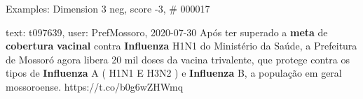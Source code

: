 \begin{frame}{Examples: Dimension 3 neg, score -3, \# 000017}
\footnotesize
\begin{alertblock}{text: t097639, user: PrefMossoro, 2020-07-30}
Após ter superado a \textbf{meta} de \textbf{cobertura} \textbf{vacinal} contra 
\textbf{Influenza} H1N1 do Ministério da Saúde, a Prefeitura de Mossoró agora 
libera 20 mil doses da vacina trivalente, que protege contra os tipos de 
\textbf{Influenza} A ( H1N1 E H3N2 ) e \textbf{Influenza} B, a população em 
geral mossoroense. https://t.co/b0g6wZHWmq 
\end{alertblock}
\end{frame}
